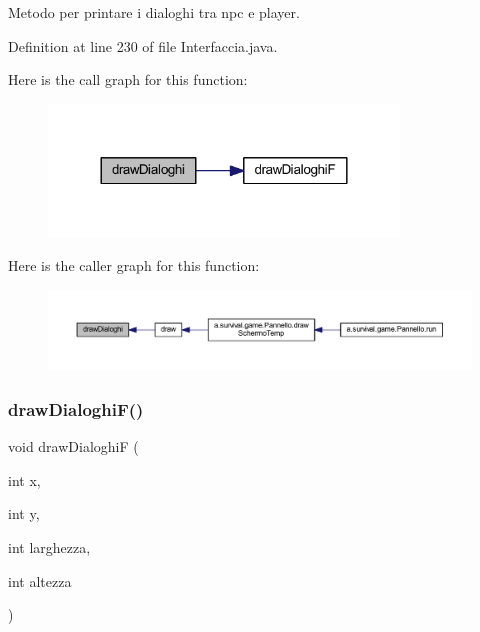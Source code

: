 Metodo per printare i dialoghi tra npc e player. 



Definition at line 230 of file Interfaccia.\+java.

Here is the call graph for this function\+:
\nopagebreak
\begin{figure}[H]
\begin{center}
\leavevmode
\includegraphics[width=264pt]{classa_1_1survival_1_1game_1_1_interfaccia_a07761ecd195353aa0f33107b57c3c852_cgraph}
\end{center}
\end{figure}
Here is the caller graph for this function\+:
\nopagebreak
\begin{figure}[H]
\begin{center}
\leavevmode
\includegraphics[width=350pt]{classa_1_1survival_1_1game_1_1_interfaccia_a07761ecd195353aa0f33107b57c3c852_icgraph}
\end{center}
\end{figure}
\mbox{\label{classa_1_1survival_1_1game_1_1_interfaccia_a73a0c3b24b1d27132d84f43de7262e36}} 
\subsubsection{\texorpdfstring{draw\+Dialoghi\+F()}{drawDialoghiF()}}
{\footnotesize\ttfamily void draw\+DialoghiF (\begin{DoxyParamCaption}\item[{int}]{x,  }\item[{int}]{y,  }\item[{int}]{larghezza,  }\item[{int}]{altezza }\end{DoxyParamCaption})}




